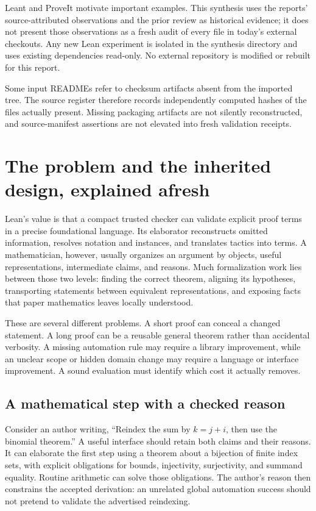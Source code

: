 \documentclass[11pt,letterpaper]{article}
\begin{document}
Leant and ProveIt motivate important examples. This synthesis uses the reports'
source-attributed observations and the prior review as historical evidence; it
does not present those observations as a fresh audit of every file in today's
external checkouts. Any new Lean experiment is isolated in the synthesis
directory and uses existing dependencies read-only. No external repository is
modified or rebuilt for this report.

Some input READMEs refer to checksum artifacts absent from the imported tree.
The source register therefore records independently computed hashes of the files
actually present. Missing packaging artifacts are not silently reconstructed,
and source-manifest assertions are not elevated into fresh validation receipts.

\section{The problem and the inherited design, explained afresh}\label{sec:baseline}
Lean's value is that a compact trusted checker can validate explicit proof terms
in a precise foundational language. Its elaborator reconstructs omitted
information, resolves notation and instances, and translates tactics into terms.
A mathematician, however, usually organizes an argument by objects, useful
representations, intermediate claims, and reasons. Much formalization work lies
between those two levels: finding the correct theorem, aligning its hypotheses,
transporting statements between equivalent representations, and exposing facts
that paper mathematics leaves locally understood.

These are several different problems. A short proof can conceal a changed
statement. A long proof can be a reusable general theorem rather than accidental
verbosity. A missing automation rule may require a library improvement, while
an unclear scope or hidden domain change may require a language or interface
improvement. A sound evaluation must identify which cost it actually removes.

\subsection{A mathematical step with a checked reason}
Consider an author writing, ``Reindex the sum by \(k=j+i\), then use the binomial
theorem.'' A useful interface should retain both claims and their reasons. It
can elaborate the first step using a theorem about a bijection of finite index
sets, with explicit obligations for bounds, injectivity, surjectivity, and
summand equality. Routine arithmetic can solve those obligations. The author's
reason then constrains the accepted derivation: an unrelated global automation
success should not pretend to validate the advertised reindexing.
\end{document}
